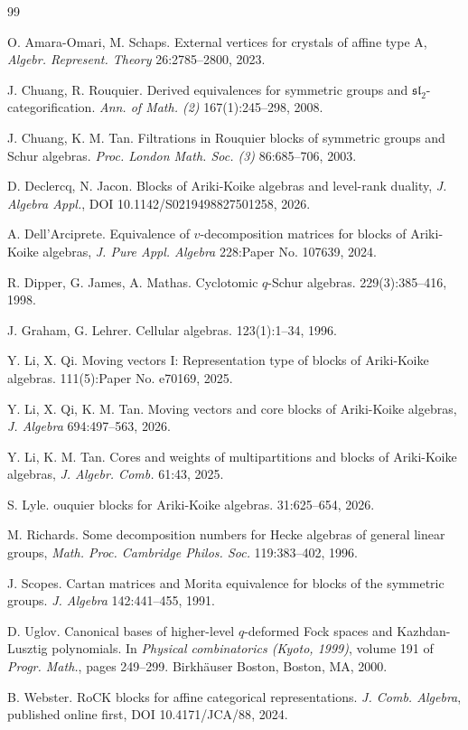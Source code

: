 \documentclass[11pt,a4paper,reqno]{amsart}
\numberwithin{equation}{section}
\theoremstyle{plain}
\theoremstyle{definition}
\theoremstyle{remark}
\numberwithin{equation}{section}
\begin{document}
\begin{thebibliography}{99}

O. Amara-Omari, M. Schaps. External vertices for crystals of affine type {A}, {\em Algebr. Represent. Theory} 26:2785--2800, 2023.

J. Chuang, R. Rouquier. Derived equivalences for symmetric groups and {$\mathfrak{sl}_2$}-categorification.
{\em Ann. of Math. (2)} 167(1):245--298, 2008.

J. Chuang, K. M. Tan.
Filtrations in {R}ouquier blocks of symmetric groups and {S}chur algebras.
{\em Proc. London Math. Soc. (3)} 86:685--706, 2003.

D. Declercq, N. Jacon. Blocks of {A}riki-{K}oike algebras and level-rank duality, 
{\em J. Algebra Appl.}, DOI 10.1142/S0219498827501258, 2026.

A. Dell'Arciprete. Equivalence of $v$-decomposition matrices for blocks of Ariki-Koike algebras, {\em J. Pure Appl. Algebra} 228:Paper No. 107639, 2024.

R. Dipper, G. James, A. Mathas.
\newblock Cyclotomic {$q$}-{S}chur algebras.
 229(3):385--416, 1998.


J. Graham, G. Lehrer.
\newblock Cellular algebras.
 123(1):1--34, 1996.

Y. Li, X. Qi.
\newblock Moving vectors {I}: Representation type of blocks of {A}riki-{K}oike algebras.
  111(5):Paper No. e70169, 2025.

Y. Li, X. Qi, K. M. Tan. Moving vectors and core blocks of Ariki-Koike algebras, {\em J. Algebra} 694:497--563, 2026.

Y. Li, K. M. Tan. Cores and weights of multipartitions and blocks of Ariki-Koike algebras, {\em J. Algebr. Comb.} 61:43, 2025.

S. Lyle.
ouquier blocks for {A}riki-{K}oike algebras.
 31:625--654, 2026.


M. Richards. Some decomposition numbers for Hecke algebras of general linear groups, {\em Math. Proc. Cambridge Philos. Soc.} 119:383--402, 1996.


J. Scopes. Cartan matrices and {M}orita equivalence for blocks of the symmetric groups. {\em J. Algebra} 142:441--455, 1991. 

D. Uglov.
\newblock Canonical bases of higher-level {$q$}-deformed {F}ock spaces and
  {K}azhdan-{L}usztig polynomials.
\newblock In {\em Physical combinatorics ({K}yoto, 1999)}, volume 191 of {\em
  Progr. Math.}, pages 249--299. Birkh\"auser Boston, Boston, MA, 2000.

B. Webster. Ro{CK} blocks for affine categorical representations. {\em J. Comb. Algebra}, published online first, {DOI 10.4171/JCA/88}, 2024.


\end{thebibliography}

\end{document}
